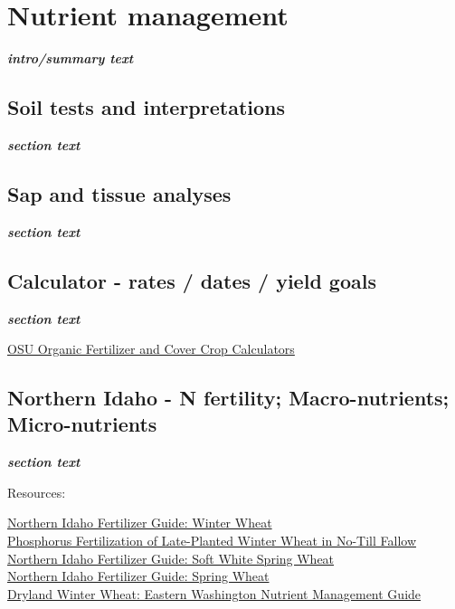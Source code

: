 \documentclass[
  letterpaper,
  DIV=11,
  numbers=noendperiod]{scrreprt}
\begin{document}

\chapter{Nutrient management}\label{nutrient-management}

\textbf{\emph{intro/summary text}}

\section{Soil tests and
interpretations}\label{soil-tests-and-interpretations}

\textbf{\emph{section text}}

\section{Sap and tissue analyses}\label{sap-and-tissue-analyses}

\textbf{\emph{section text}}

\section{Calculator - rates / dates / yield
goals}\label{calculator---rates-dates-yield-goals}

\textbf{\emph{section text}}

\href{https://smallfarms.oregonstate.edu/calculator}{OSU Organic
Fertilizer and Cover Crop Calculators}

\section{Northern Idaho - N fertility; Macro-nutrients;
Micro-nutrients}\label{northern-idaho---n-fertility-macro-nutrients-micro-nutrients}

\textbf{\emph{section text}}

Resources:

\href{https://www.uidaho.edu/-/media/uidaho-responsive/files/extension/publications/cis/cis0453.pdf}{Northern
Idaho Fertilizer Guide: Winter Wheat}\\
\href{https://extension.oregonstate.edu/catalog/pub/pnw-631-phosphorus-fertilization-late-planted-winter-wheat-no-till-fallow}{Phosphorus
Fertilization of Late-Planted Winter Wheat in No-Till Fallow}\\
\href{https://www.uidaho.edu/-/media/UIdaho-Responsive/Files/Extension/publications/cis/cis1101.pdf}{Northern
Idaho Fertilizer Guide: Soft White Spring Wheat}\\
\href{https://objects.lib.uidaho.edu/uiext/uiext30490.pdf}{Northern
Idaho Fertilizer Guide: Spring Wheat}\\
\href{https://pubs.extension.wsu.edu/dryland-winter-wheat-eastern-washington-nutrient-management-guide}{Dryland
Winter Wheat: Eastern Washington Nutrient Management Guide}
\end{document}
